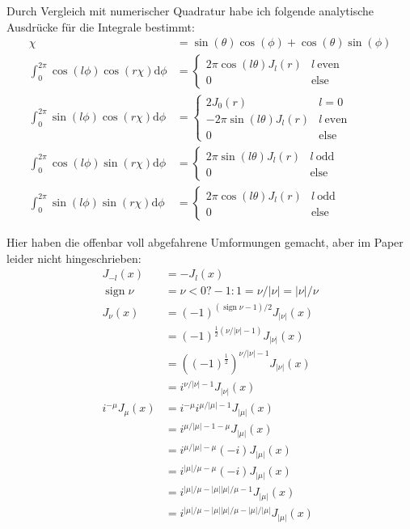 \documentclass{article}
\DeclareMathOperator{\sign}{sign}
\begin{document}
Durch Vergleich mit numerischer Quadratur habe ich folgende
analytische Ausdr\"ucke f\"ur die Integrale bestimmt:
\begin{align}
  \chi &= \sin(\theta)\cos(\phi)+\cos(\theta)\sin(\phi) \\
  \int_0^{2\pi}\cos(l \phi)\cos(r\chi) \textrm{d}\phi &=
  \begin{cases}
    2 \pi \cos(l\theta)  J_l(r) & l\ \textrm{even} \\
    0 & \textrm{else} \end{cases}\\
  \int_0^{2\pi}\sin(l \phi)\cos(r\chi) \textrm{d}\phi &=
  \begin{cases}
    2 J_0(r) & l=0 \\
    -2 \pi \sin(l\theta)  J_l(r) & l\ \textrm{even} \\
    0 & \textrm{else} \end{cases}\\
  \int_0^{2\pi}\cos(l \phi)\sin(r\chi) \textrm{d}\phi &=
  \begin{cases}
    2 \pi \sin(l\theta)  J_l(r) & l\ \textrm{odd} \\
    0 & \textrm{else} \end{cases}\\
  \int_0^{2\pi}\sin(l \phi)\sin(r\chi) \textrm{d}\phi &=
  \begin{cases}
    2 \pi \cos(l\theta)  J_l(r) & l\ \textrm{odd} \\
    0 & \textrm{else} \end{cases}  
\end{align}



Hier haben die offenbar voll abgefahrene Umformungen gemacht, aber im
Paper leider nicht hingeschrieben:
\begin{align}
J_{-l}(x) &= -J_l(x) \\
\sign \nu &= \nu<0 ? -1 : 1 = \nu/|\nu| = |\nu|/\nu \\
J_\nu(x) &= (-1)^{(\sign{\nu}-1)/2} J_{|\nu|}(x) \\ 
& = (-1)^{\frac{1}{2}(\nu/|\nu|-1)} J_{|\nu|}(x) \\ 
& = ((-1)^{\frac{1}{2}})^{\nu/|\nu|-1} J_{|\nu|}(x) \\ 
& = i^{\nu/|\nu|-1} J_{|\nu|}(x)\\
i^{-\mu} J_\mu(x) &= i^{-\mu} i^{\mu/|\mu|-1} J_{|\mu|}(x)\\
&= i^{\mu/|\mu|-1 -\mu } J_{|\mu|}(x) \\
&= i^{\mu/|\mu| -\mu } (-i) J_{|\mu|}(x) \\
&= i^{|\mu|/\mu-\mu} (-i) J_{|\mu|}(x) \\
&= i^{|\mu|/\mu-|\mu| |\mu| /\mu-1} J_{|\mu|}(x) \\
&= i^{|\mu|/\mu-|\mu| |\mu| /\mu-|\mu|/|\mu|} J_{|\mu|}(x)
\end{align}
\end{document}

